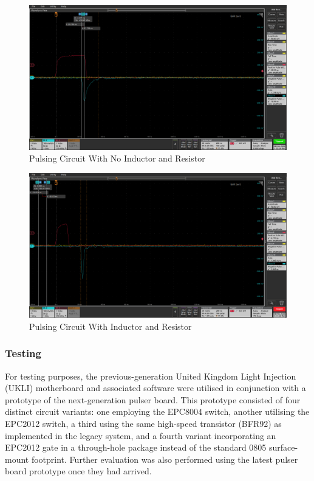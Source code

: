 \documentclass[a4paper,11pt]{article}
\begin{document}
\begin{figure}[htbp]
\centering
\includegraphics[scale=0.3]{RCTHTest1 no inductor.png}
\caption{Pulsing Circuit With No Inductor and Resistor\label{fig:NoRLPulse}}
\end{figure}

\begin{figure}[htbp]
\centering
\includegraphics[scale=0.3]{RCTHTest1 inductor circuit.png}
\caption{Pulsing Circuit With Inductor and Resistor\label{fig:RLPulse}}
\end{figure}

\subsubsection{Testing}\label{sec:LEDtesting}

For testing purposes, the previous-generation United Kingdom Light Injection (UKLI) motherboard and associated software were utilised in conjunction with a prototype of the next-generation pulser board. This prototype consisted of four distinct circuit variants: one employing the EPC8004 switch, another utilising the EPC2012 switch, a third using the same high-speed transistor (BFR92) as implemented in the legacy system, and a fourth variant incorporating an EPC2012 gate in a through-hole package instead of the standard 0805 surface-mount footprint. Further evaluation was also performed using the latest pulser board prototype once they had arrived.
\end{document}
